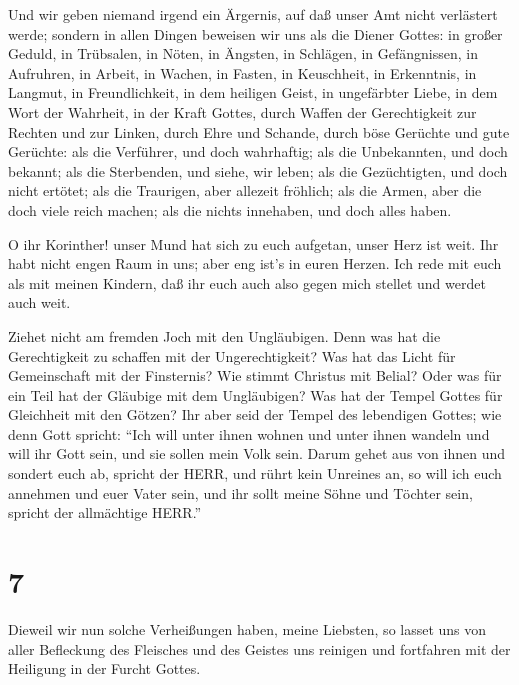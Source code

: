  Und wir geben niemand irgend ein Ärgernis, auf daß unser
Amt nicht verlästert werde;  sondern in allen Dingen
beweisen wir uns als die Diener Gottes: in großer Geduld, in Trübsalen,
in Nöten, in Ängsten,  in Schlägen, in Gefängnissen, in
Aufruhren, in Arbeit, in Wachen, in Fasten,  in Keuschheit,
in Erkenntnis, in Langmut, in Freundlichkeit, in dem heiligen Geist, in
ungefärbter Liebe,  in dem Wort der Wahrheit, in der Kraft
Gottes, durch Waffen der Gerechtigkeit zur Rechten und zur Linken,
 durch Ehre und Schande, durch böse Gerüchte und gute
Gerüchte: als die Verführer, und doch wahrhaftig;  als die
Unbekannten, und doch bekannt; als die Sterbenden, und siehe, wir leben;
als die Gezüchtigten, und doch nicht ertötet;  als die
Traurigen, aber allezeit fröhlich; als die Armen, aber die doch viele
reich machen; als die nichts innehaben, und doch alles haben.

 O ihr Korinther! unser Mund hat sich zu euch aufgetan,
unser Herz ist weit.  Ihr habt nicht engen Raum in uns;
aber eng ist's in euren Herzen.  Ich rede mit euch als mit
meinen Kindern, daß ihr euch auch also gegen mich stellet und werdet
auch weit.

 Ziehet nicht am fremden Joch mit den Ungläubigen. Denn was
hat die Gerechtigkeit zu schaffen mit der Ungerechtigkeit? Was hat das
Licht für Gemeinschaft mit der Finsternis?  Wie stimmt
Christus mit Belial? Oder was für ein Teil hat der Gläubige mit dem
Ungläubigen?  Was hat der Tempel Gottes für Gleichheit mit
den Götzen? Ihr aber seid der Tempel des lebendigen Gottes; wie denn
Gott spricht: ``Ich will unter ihnen wohnen und unter ihnen wandeln und
will ihr Gott sein, und sie sollen mein Volk sein.  Darum
gehet aus von ihnen und sondert euch ab, spricht der HERR, und rührt
kein Unreines an, so will ich euch annehmen  und euer Vater
sein, und ihr sollt meine Söhne und Töchter sein, spricht der
allmächtige HERR.''

\hypertarget{section-6}{%
\section{7}\label{section-6}}

 Dieweil wir nun solche Verheißungen haben, meine Liebsten,
so lasset uns von aller Befleckung des Fleisches und des Geistes uns
reinigen und fortfahren mit der Heiligung in der Furcht Gottes.


